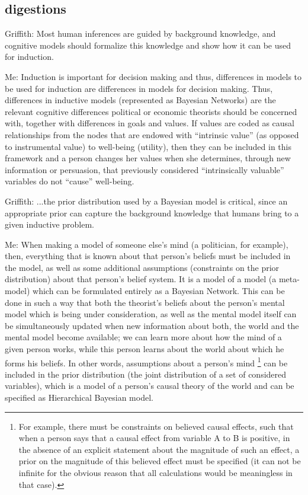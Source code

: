 \documentclass[12pt]{article}
\begin{document}
\subsection{digestions}
Griffith:
Most human inferences are guided by background knowledge, and cognitive models should formalize this knowledge and show how it can be used for induction.
 
Me:
Induction is important for decision making and thus, differences in models to be used for induction are differences in models for decision making. Thus, differences in inductive models (represented as Bayesian Networks) are the relevant cognitive differences political or economic theorists should be concerned with, together with differences in goals and values.  If values are coded as causal relationships from the nodes that are endowed with ``intrinsic value'' (as opposed to instrumental value) to well-being (utility), then they can be included in this framework and a person changes her values when she determines, through new information or persuasion, that previously considered ``intrinsically valuable'' variables do not ``cause'' well-being. 
 
Griffith:
...the prior distribution used by a Bayesian model is critical, since an appropriate prior can capture the background knowledge that humans bring to a given inductive problem. 

Me:
When making a model of someone else's mind (a politician, for example), then, everything that is known about that person's beliefs must be included in the model, as well as some additional assumptions (constraints on the prior distribution) about that person's belief system. It is a model of a model (a meta-model) which can be formulated entirely as a Bayesian Network. This can be done in such a way that both the theorist's beliefs about the person's mental model which is being under consideration, as well as the mental model itself can be simultaneously updated when new information about both, the world and the mental model become available; we can learn more about how the mind of a given person works, while this person learns about the world about which he forms his beliefs. In other words, assumptions about a person's mind \footnote{For example, there must be constraints on believed causal effects, such that when a person says that a causal effect from variable A to B is positive, in the absence of an explicit statement about the magnitude of such an effect, a prior on the magnitude of this believed effect must be specified (it can not be infinite for the obvious reason that all calculations would be meaningless in that case).} can be included in the prior distribution (the joint distribution of a set of considered variables), which is a model of a person's causal theory of the world and can be specified as Hierarchical Bayesian model.       
 
\end{document}
